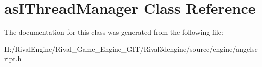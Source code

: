 \hypertarget{classas_i_thread_manager}{}\section{as\+I\+Thread\+Manager Class Reference}
\label{classas_i_thread_manager}


The documentation for this class was generated from the following file\+:\begin{DoxyCompactItemize}
\item 
H\+:/\+Rival\+Engine/\+Rival\+\_\+\+Game\+\_\+\+Engine\+\_\+\+G\+I\+T/\+Rival3dengine/source/engine/angelscript.\+h\end{DoxyCompactItemize}
